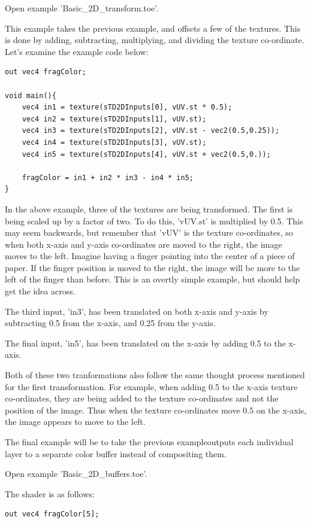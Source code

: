 \begin{fullwidth}
Open example 'Basic\_2D\_transform.toe'.

This example takes the previous example, and offsets a few of the textures. This is done by adding, subtracting, multiplying, and dividing the texture co-ordinate. Let's examine the example code below:

\begin{lstlisting}
out vec4 fragColor;

void main(){
	vec4 in1 = texture(sTD2DInputs[0], vUV.st * 0.5);
	vec4 in2 = texture(sTD2DInputs[1], vUV.st);
	vec4 in3 = texture(sTD2DInputs[2], vUV.st - vec2(0.5,0.25));
	vec4 in4 = texture(sTD2DInputs[3], vUV.st);
	vec4 in5 = texture(sTD2DInputs[4], vUV.st + vec2(0.5,0.));

	fragColor = in1 + in2 * in3 - in4 * in5;
}
\end{lstlisting}

In the above example, three of the textures are being transformed. The first is being scaled up by a factor of two. To do this, 'vUV.st' is multiplied by 0.5. This may seem backwards, but remember that 'vUV' is the texture co-ordinates, so when both x-axis and y-axis co-ordinates are moved to the right, the image moves to the left. Imagine having a finger pointing into the center of a piece of paper. If the finger position is moved to the right, the image will be more to the left of the finger than before. This is an overtly simple example, but should help get the idea across.

The third input, 'in3', has been translated on both x-axis and y-axis by subtracting 0.5 from the x-axis, and 0.25 from the y-axis. 

The final input, 'in5', has been translated on the x-axis by adding 0.5 to the x-axis. 

Both of these two tranformations also follow the same thought process mentioned for the first transformation. For example, when adding 0.5 to the x-axis texture co-ordinates, they are being added to the texture co-ordinates and not the position of the image. Thus when the texture co-ordinates move 0.5 on the x-axis, the image appears to move to the left.

The final example will be to take the previous exampleoutputs each individual layer to a separate color buffer instead of compositing them.

Open example 'Basic\_2D\_buffers.toe'.

The shader is as follows:

\begin{lstlisting}
out vec4 fragColor[5];


\end{lstlisting}
\end{fullwidth}
